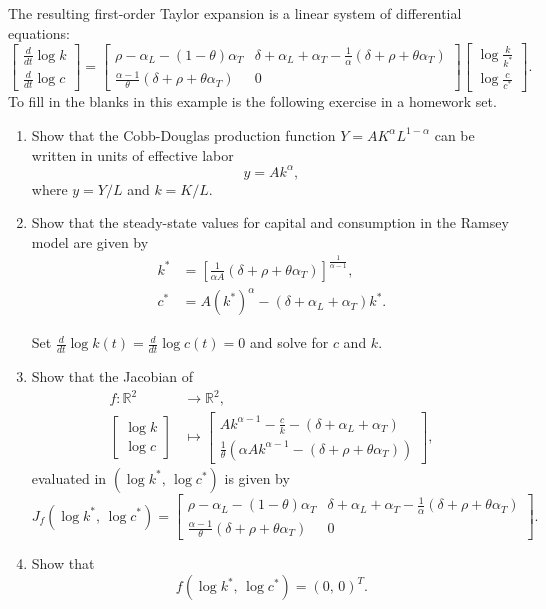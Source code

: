 \documentclass[10pt]{article}
\newcommand{\R}{\mathds{R}}
\begin{document}
The resulting first-order Taylor expansion is a linear system of differential equations:
\[
\left[ \begin{array}{c} \frac{d}{dt} \log k \\ \frac{d}{dt} \log c \end{array} \right] = \left[ \begin{array}{cc} \rho-\alpha_L-(1-\theta)\alpha_T & \delta+\alpha_L+\alpha_T-\frac{1}{\alpha}(\delta+\rho+\theta\alpha_T) \\ \frac{\alpha-1}{\theta}(\delta+\rho+\theta\alpha_T) & 0 \end{array} \right] \left[ \begin{array}{c} \log \frac{k}{k^\ast} \\ \log \frac{c}{c^\ast} \end{array} \right].
\]
To fill in the blanks in this example is the following exercise in a homework set. 

\begin{enumerate}
	\item Show that the Cobb-Douglas production function $Y=AK^\alpha L^{1-\alpha}$ can be written in units of effective labor
	\[
	y = A k^\alpha,
	\]
	where $y=Y/L$ and $k=K/L$.
	\item Show that the steady-state values for capital and consumption in the Ramsey model are given by 
	\begin{align*}
	k^\ast &= \left[ \frac{1}{\alpha A} (\delta + \rho + \theta\alpha_T) \right]^{\frac{1}{\alpha-1}},\\
	c^\ast &= A (k^\ast)^\alpha - (\delta + \alpha_L + \alpha_T) k^\ast.
	\end{align*}
	
	Set $\frac{d}{dt} \log k(t) = \frac{d}{dt}\log c(t) = 0$ and solve for $c$ and $k$.
	
	\item Show that the Jacobian of
	\begin{align*}
	f : \R^2 &\longrightarrow \R^2,\\
	\left[ \begin{array}{c} \log k \\ \log c \end{array} \right] &\longmapsto \left[ \begin{array}{c} Ak^{\alpha-1} - \frac{c}{k} - (\delta + \alpha_L + \alpha_T) \\ \frac{1}{\theta} \left(\alpha A k^{\alpha-1} - (\delta + \rho + \theta\alpha_T)\right) \end{array} \right],
	\end{align*}
	evaluated in $(\log k^\ast,\, \log c^\ast)$ is given by
	\[
	J_f(\log k^*,\,\log c^* ) = \left[ \begin{array}{cc} \rho - \alpha_L - (1-\theta) \alpha_T & \delta + \alpha_L + \alpha_T - \frac{1}{\alpha} (\delta + \rho + \theta\alpha_T) \\ \frac{\alpha-1}{\theta} (\delta + \rho + \theta\alpha_T)  &   0 \end{array} \right].
	\]
	\item Show that
	\[
	f(\log k^*,\, \log c^*) = (0,\, 0)^T.
	\]
\end{enumerate}
\end{document}
